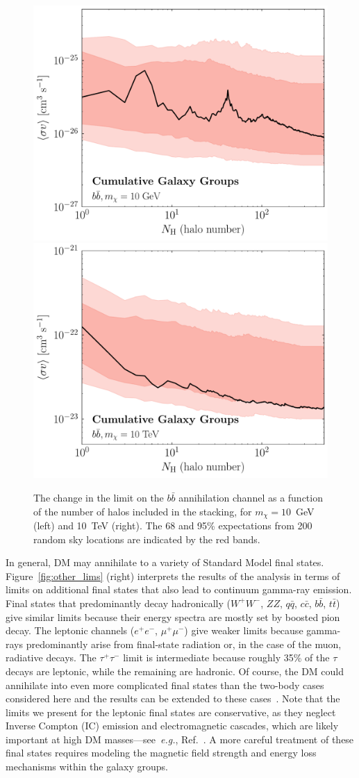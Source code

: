 \begin{figure}[b]
  \centering
	\includegraphics[width=.45\textwidth]{ch-clusters/plots/elephant10.pdf} 
	\includegraphics[width=.45\textwidth]{ch-clusters/plots/elephant10000.pdf} 
  \caption{The change in the limit on the $b\bar{b}$ annihilation channel as a function of the number of halos included in the stacking, for $m_\chi= 10$~GeV (left) and 10~TeV (right). The 68 and 95\% expectations from 200 random sky locations are indicated by the red bands.}
  \label{fig:moreelephants}
\end{figure}

In general, DM may annihilate to a variety of Standard Model final states.  Figure~\ref{fig:other_lims} (right) interprets the results of the analysis in terms of limits on additional final states that also lead to continuum gamma-ray emission.  Final states that predominantly decay hadronically  ($W^+ W^-$, $ZZ$, $q \bar{q}$, $c \bar c$, $b \bar b$, $t \bar t$) give similar limits because their energy spectra are mostly set by boosted pion decay.  The leptonic channels ($e^+ e^-$, $\mu^+ \mu^-$) give weaker limits because gamma-rays predominantly arise from final-state radiation or, in the case of the muon, radiative decays.  The $\tau^+ \tau^-$ limit is intermediate because roughly 35\% of the $\tau$ decays are leptonic, while the remaining are hadronic.   Of course, the DM could annihilate into even more complicated final states than the two-body cases considered here and the results can be extended to these cases~\cite{Elor:2015tva,Elor:2015bho}.  Note that the limits we present for the leptonic final states are conservative, as they neglect Inverse Compton (IC) emission and electromagnetic cascades, which are likely important at high DM masses---see~\emph{e.g.}, Ref.~\cite{Cirelli:2009dv, Murase:2012xs}.  A more careful treatment of these final states requires modeling the magnetic field strength and energy loss mechanisms within the galaxy groups. 
\vspace{0.1in}

